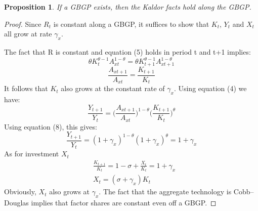 \documentclass{article}
\begin{document}
    \theoremstyle{plain}
    \newtheorem{pro}{Proposition}
    \begin{pro}
        If a GBGP exists, then the Kaldor facts hold along the GBGP.
    \end{pro}
    \begin{proof}
        Since $R_t$ is constant along a GBGP, it suffices to show that $K_t$, $Y_t$ and $X_t$ all grow at rate $\gamma_x$.

        The fact that R is constant and equation (5) holds in period t and t+1 implies:
        \begin{equation*}
            \theta K_t^{\theta-1} A_{xt}^{1-\theta} = \theta K_{t+1}^{\theta-1} A_{xt+1}^{1-\theta}
        \end{equation*}
        \begin{equation}
            \frac{A_{xt+1}}{A_{xt}}=\frac{K_{t+1}}{K_t}
        \end{equation}
        It follows that $K_t$ also grows at the constant rate of $\gamma_x$. Using equation (4) we have:
        \begin{equation}
            \frac{Y_{t+1}}{Y_t}=\biggl( \frac{A_{xt+1}}{A_{xt}} \biggr)^{1-\theta} \biggl( \frac{K_{t+1}}{K_t} \biggr)^\theta
        \end{equation}
        Using equation (8), this gives:
        \begin{equation}
            \frac{Y_{t+1}}{Y_t}=(1+\gamma_x)^{1-\theta}(1+\gamma_x)^\theta=1+\gamma_x
        \end{equation}
        As for investment $X_t$
        \begin{align*}
            &\frac{K_{t+1}}{K_t}=1-\sigma+\frac{X_t}{K_t}=1+\gamma_x\\
            &X_t=(\sigma+\gamma_x)K_t
        \end{align*}
        Obviously, $X_t$ also grows at $\gamma_x$. The fact that the aggregate technology is Cobb–Douglas implies that factor shares are constant even off a GBGP.
    \end{proof}
    
\end{document}
